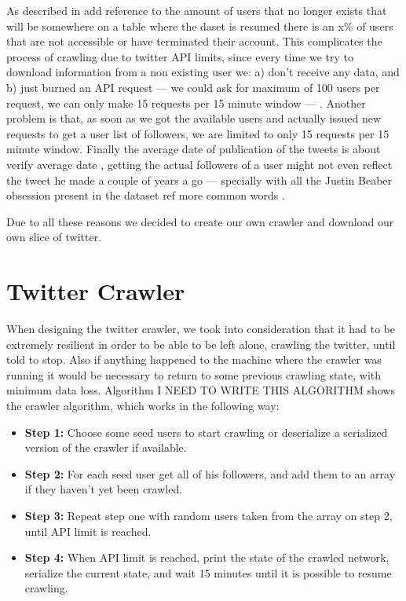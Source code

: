 As described in {\color{red} add reference to the amount of users that no longer exists that will be somewhere on a table where the daset is resumed } there is an x\% of users that are not accessible or have terminated their account. This complicates the process of crawling due to twitter API limits, since every time we try to download information from a non existing user we: a) don't receive any data, and b) just burned an API request --- we could ask for maximum of 100 users per request, we can only make 15 requests per 15 minute window --- . Another problem is that, as soon as we got the available users and actually issued new requests to get a user list of followers, we are limited to only 15 requests per 15 minute window. Finally the average date of publication of the tweets is about {\color{red} verify average date }, getting the actual followers of a user might not even reflect the tweet he made a couple of years a go --- specially with all the Justin Beaber obsession present in the dataset {\color{red} ref more common words }.

Due to all these reasons we decided to create our own crawler and download our own slice of twitter.

\section{Twitter Crawler}
\label{sec:twitter_crawler}
When designing the twitter crawler, we took into consideration that it had to be extremely resilient in order to be able to be left alone, crawling the twitter, until told to stop. Also if anything happened to the machine where the crawler was running it would be necessary to return to some previous crawling state, with minimum data loss. Algorithm {\color{red} I NEED TO WRITE THIS ALGORITHM } shows the crawler algorithm, which works in the following way:

\begin{itemize}
  \item \textbf{Step 1:} Choose some seed users to start crawling or deserialize a serialized version of the crawler if available.
  \item \textbf{Step 2:} For each seed user get all of his followers, and add them to an array if they haven't yet been crawled.
  \item \textbf{Step 3:} Repeat step one with random users taken from the array on step 2, until API limit is reached.
  \item \textbf{Step 4:} When API limit is reached, print the state of the crawled network, serialize the current state, and wait 15 minutes until it is possible to resume crawling. 
\end{itemize}

